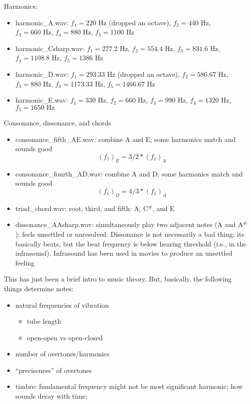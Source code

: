 Harmonics:
\begin{itemize}
\item harmonic\_A.wav: $f_1=220\mbox{ Hz}$ (dropped an octave), $f_2=440\mbox{ Hz}$, $f_3=660\mbox{ Hz}$, $f_4=880\mbox{ Hz}$, $f_5=1100\mbox{ Hz}$
\item harmonic\_Csharp.wav: $f_1=277.2\mbox{ Hz}$, $f_2=554.4\mbox{ Hz}$, $f_3=831.6\mbox{ Hz}$, $f_4=1108.8\mbox{ Hz}$, $f_5=1386\mbox{ Hz}$
\item harmonic\_D.wav: $f_1=293.33\mbox{ Hz}$ (dropped an octave), $f_2=586.67\mbox{ Hz}$, $f_3=880\mbox{ Hz}$, $f_4=1173.33\mbox{ Hz}$, $f_5=1466.67\mbox{ Hz}$
\item harmonic\_E.wav: $f_1=330\mbox{ Hz}$, $f_2=660\mbox{ Hz}$, $f_3=990\mbox{ Hz}$, $f_4=1320\mbox{ Hz}$, $f_5=1650\mbox{ Hz}$
\end{itemize}

Consonance, dissonance, and chords
\begin{itemize}
\item consonance\_fifth\_AE.wav: combine A and E; some harmonics match and sounds good 
$$\left(f_1\right)_E=3/2*\left(f_1\right)_A$$
\item consonance\_fourth\_AD.wav: combine A and D; some harmonics match and sounds good 
  $$\left(f_1\right)_D=4/3*\left(f_1\right)_A$$
\item triad\_chord.wav: root, third, and fifth: A, C$^\#$, and E
\item dissonance\_AAsharp.wav: simultaneously play two adjacent notes (A and A$^\#$); feels unsettled or unresolved. Dissonance is not necessarily a bad thing; its basically beats, but the beat frequency is below hearing threshold (i.e., in the infrasound). Infrasound has been used in movies to produce an unsettled feeling
\end{itemize}
  
This has just been a brief intro to music theory. But, basically, the following things determine notes:
\begin{itemize}
\item natural frequencies of vibration
  \begin{itemize}
  \item tube length
  \item open-open vs open-closed
  \end{itemize}
\item number of overtones/harmonics
\item ``preciseness'' of overtones
\item timbre: fundamental frequency might not be most significant harmonic; how sounds decay with time;
\end{itemize}

